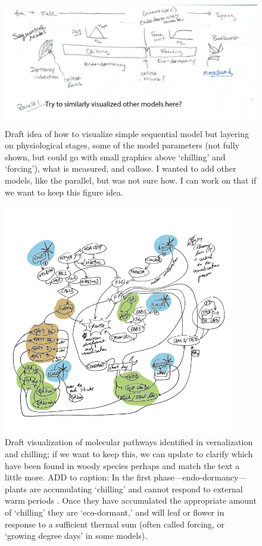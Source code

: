 \documentclass[11pt]{article}
\begin{document}
\begin{figure}[h!]
\includegraphics[width=1\textwidth]{..//figures/chillingmodel_drafttext.png}
\caption{Draft idea of how to visualize simple sequential model but layering on physiological stages, some of the model parameters (not fully shown, but could go with small graphics above `chilling' and `forcing'), what is measured, and callose. I wanted to add other models, like the parallel, but was not sure how. I can work on that if we want to keep this figure idea.} 
\label{fig:modelsketch}
\end{figure}

\begin{figure}[h!]
\includegraphics[width=0.9\textwidth]{..//figures/biochemicalModelSketch.png}
\caption{Draft visualization of molecular pathways identified in vernalization and chilling; if we want to keep this, we can update to clarify which have been found in woody species perhaps and match the text a little more. ADD to caption: In the first phase---endo-dormancy---plants are accumulating `chilling' and cannot respond to external warm periods  \citep[thus the `endo' part of the term,][]{chuine2016,lundell2020}. Once they have accumulated the appropriate amount of `chilling' they are `eco-dormant,' and will leaf or flower in response to a sufficient thermal sum (often called forcing, or `growing degree days' in some models). } 
\label{fig:molecular}
\end{figure}
\end{document}
